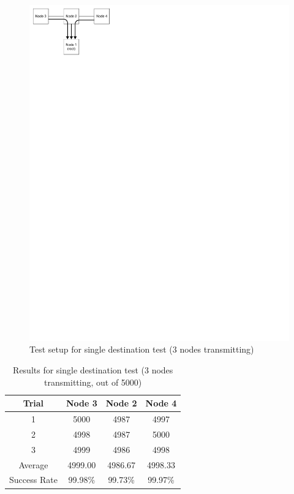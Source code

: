 \begin{figure}[ptb]
	\begin{centering}
		\includegraphics{Protocol/Figures/protocol-3_t_flood_test.pdf}
		\caption{Test setup for single destination test (3 nodes transmitting)}
		\label{fig:protocol:3_t_flood_test}
	\end{centering}
\end{figure}

\begin{table}
	\begin{center}
		\setlength{\extrarowheight}{1.5pt}
		\caption{Results for single destination test (3 nodes transmitting, out of 5000)}
		\vspace{0.1cm}
		\begin{tabular} {|c|c|c|c|}
			\hline
			\textbf{Trial} & \textbf{Node 3} & \textbf{Node 2} & \textbf{Node 4} \\
			\hline
			\hline
			1 & 5000 & 4987 & 4997 \\
			\hline
			2 & 4998 & 4987 & 5000 \\
			\hline
			3 & 4999 & 4986 & 4998 \\
			\hline
			\hline
			Average & 4999.00 & 4986.67 & 4998.33 \\
			\hline
			Success Rate & 99.98\% &99.73\% &99.97\% \\
			\hline
		\end{tabular}
		\label{tab:protocol:3_t_flood_test}
	\end{center}
\end{table}

